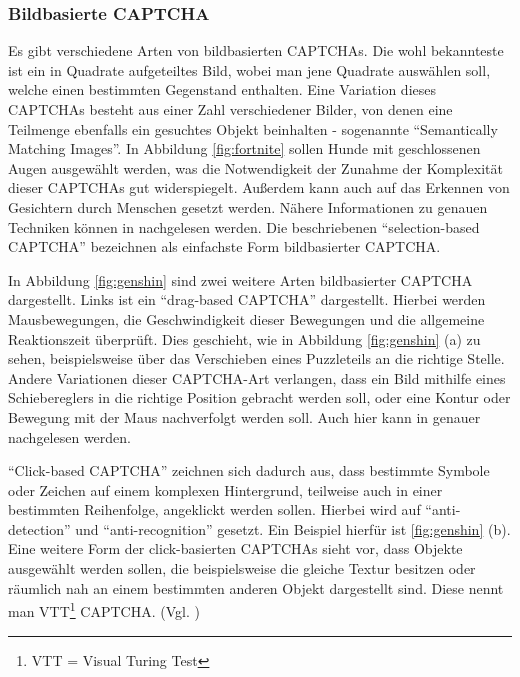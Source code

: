 \subsubsection*{Bildbasierte CAPTCHA}
Es gibt verschiedene Arten von bildbasierten CAPTCHAs. 
Die wohl bekannteste ist ein in Quadrate aufgeteiltes Bild, wobei man jene Quadrate auswählen soll, welche einen bestimmten Gegenstand enthalten.
Eine Variation dieses CAPTCHAs besteht aus einer Zahl verschiedener Bilder, von denen eine Teilmenge ebenfalls ein gesuchtes Objekt beinhalten -
sogenannte ``Semantically Matching Images''. \cite[p.77]{surveyofresearch}
In Abbildung \ref{fig:fortnite} sollen Hunde mit geschlossenen Augen ausgewählt werden,
was die Notwendigkeit der Zunahme der Komplexität dieser CAPTCHAs gut widerspiegelt. 
Außerdem kann auch auf das Erkennen von Gesichtern durch Menschen gesetzt werden.
Nähere Informationen zu genauen Techniken können in \cite[p.xx]{surveyofresearch} nachgelesen werden.
Die beschriebenen ``selection-based CAPTCHA'' bezeichnen \citeauthor{surveyofresearch} als einfachste Form bildbasierter CAPTCHA.

In Abbildung \ref{fig:genshin} sind zwei weitere Arten bildbasierter CAPTCHA dargestellt.
Links ist ein ``drag-based CAPTCHA'' dargestellt.
Hierbei werden Mausbewegungen, die Geschwindigkeit dieser Bewegungen
und die allgemeine Reaktionszeit überprüft.
Dies geschieht, wie in Abbildung \ref{fig:genshin} (a) zu sehen,
beispielsweise über das Verschieben eines Puzzleteils an die richtige Stelle.
Andere Variationen dieser CAPTCHA-Art verlangen, dass ein Bild mithilfe eines Schiebereglers in die richtige Position gebracht werden soll,
oder eine Kontur oder Bewegung mit der Maus nachverfolgt werden soll.
Auch hier kann in \cite[p.77]{surveyofresearch} genauer nachgelesen werden.

``Click-based CAPTCHA'' zeichnen sich dadurch aus, dass bestimmte Sym\-bole oder Zeichen auf einem komplexen Hintergrund, 
teilweise auch in einer bestimmten Reihenfolge, angeklickt werden sollen.
Hierbei wird auf ``anti-detection'' und ``anti-recognition'' gesetzt. \cite[p.77]{surveyofresearch}
Ein Beispiel hierfür ist \ref{fig:genshin} (b).
Eine weitere Form der click-basierten CAPTCHAs sieht vor, dass Objekte ausgewählt werden sollen,
die beispielsweise die gleiche Textur besitzen oder räumlich nah an einem bestimmten anderen Objekt dargestellt sind. 
Diese nennt man VTT\footnote[1]{VTT = Visual Turing Test} CAPTCHA. (Vgl. \cite[p.78]{surveyofresearch})

